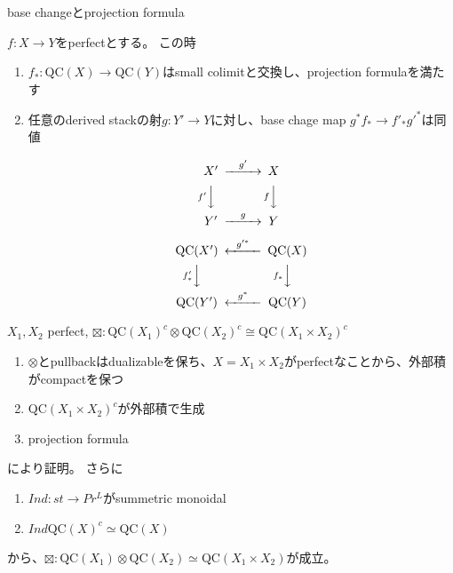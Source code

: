 \documentclass[dvipdfmx]{beamer}
\newcommand{\QC}{\mathrm{QC}}
\begin{document}
\begin{frame}{base changeとprojection formula}

\begin{prop}
$f:X \to Y$をperfectとする。
この時
\begin{enumerate}
\item $f_*:\QC(X) \to \QC(Y)$はsmall colimitと交換し、projection formulaを満たす
\item 任意のderived stackの射$g:Y' \to Y$に対し、base chage map $g^*f_* \to f'_*g'^*$は同値
\begin{multicols}{2}
\[
\begin{CD}
X'@>g'>>X\\
@Vf'VV@VfVV\\
Y'@>g>>Y
\end{CD}
\]

\[
\begin{CD}
\QC(X')@<g'^*<<\QC(X)\\
@Vf'_*VV@Vf_*VV\\
\QC(Y')@<g^*<<\QC(Y)
\end{CD}
\]
\end{multicols}
\end{enumerate}
\end{prop}
\end{frame}

\begin{frame}
\begin{prop}
$X_1, X_2$ perfect, $\boxtimes:\QC(X_1)^c\otimes \QC(X_2)^c \cong \QC(X_1\times X_2)^c$
\end{prop}
\begin{enumerate}
\item $\otimes$とpullbackはdualizableを保ち、$X=X_1\times X_2$がperfectなことから、外部積がcompactを保つ
\item $\QC(X_1\times X_2)^c$が外部積で生成
\item projection formula
\end{enumerate}
により証明。
さらに
\begin{enumerate}
\item $Ind:st \to Pr^L$がsummetric monoidal
\item $Ind\QC(X)^c\simeq \QC(X)$
\end{enumerate}
から、$\boxtimes:\QC(X_1)\otimes \QC(X_2) \simeq \QC(X_1\times X_2)$が成立。
\end{frame}
\end{document}
